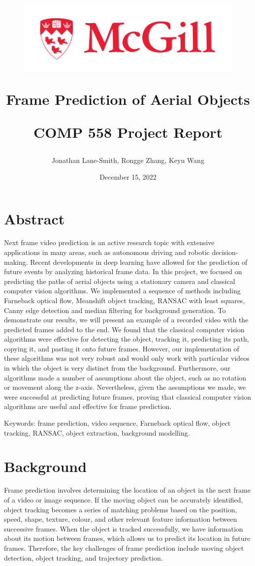 \documentclass[12pt]{article}
\title{
\vspace{80}
\begin{figure}[h]
  \centering
    \includegraphics[scale=2]{figures/mcgill_sig_red.jpg}
\end{figure}
\vspace{50}
Frame Prediction of Aerial Objects
\vspace{20}

COMP 558 Project Report
\vspace{50}
}
\author{Jonathan Lane-Smith, Rongge Zhang, Keyu Wang \vspace{30}}
\date{December 15, 2022}
\begin{document}
\maketitle
\clearpage

\section*{Abstract}

Next frame video prediction is an active research topic with extensive applications in many areas, such as autonomous driving and robotic decision-making. Recent developments in deep learning have allowed for the prediction of future events by analyzing historical frame data. In this project, we focused on predicting the paths of aerial objects using a stationary camera and classical computer vision algorithms. We implemented a sequence of methods including Farneback optical flow, Meanshift object tracking, RANSAC with least squares, Canny edge detection and median filtering for background generation. To demonstrate our results, we will present an example of a recorded video with the predicted frames added to the end. We found that the classical computer vision algorithms were effective for detecting the object, tracking it, predicting its path, copying it, and pasting it onto future frames. However, our implementation of these algorithms was not very robust and would only work with particular videos in which the object is very distinct from the background. Furthermore, our algorithms made a number of assumptions about the object, such as no rotation or movement along the z-axis. Nevertheless, given the assumptions we made, we were successful at predicting future frames, proving that classical computer vision algorithms are useful and effective for frame prediction.

Keywords: frame prediction, video sequence, Farneback optical flow, object tracking, RANSAC, object extraction, background modelling.


\section*{Background}
Frame prediction involves determining the location of an object in the next frame of a video or image sequence. If the moving object can be accurately identified, object tracking becomes a series of matching problems based on the position, speed, shape, texture, colour, and other relevant feature information between successive frames. When the object is tracked successfully, we have information about its motion between frames, which allows us to predict its location in future frames. Therefore, the key challenges of frame prediction include moving object detection, object tracking, and trajectory prediction.
\end{document}
